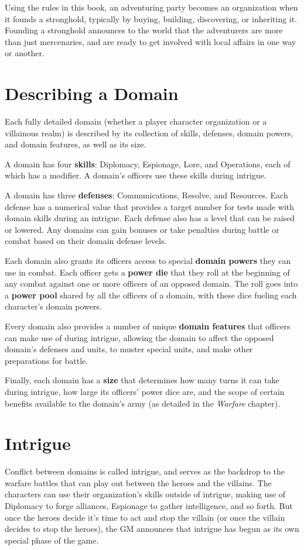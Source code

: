\documentclass[10pt,a4paper,twoside,bg=print,twocolumn,openany,nodeprecatedcode]{dndbook}
\begin{document}
Using the rules in this book, an adventuring party becomes an organization when it founds a stronghold, typically by buying, building, discovering, or inheriting it. Founding a stronghold announces to the world that the adventurers are more than just mercenaries, and are ready to get involved with local affairs in one way or another.

\section{Describing a Domain}
Each fully detailed domain (whether a player character organization or a villainous realm) is described by its collection of skills, defenses, domain powers, and domain features, as well as its size.

A domain has four \textbf{skills}: Diplomacy, Espionage, Lore, and Operations, each of which has a modifier. A domain's officers use these skills during intrigue.

A domain has three \textbf{defenses}: Communications, Resolve, and Resources. Each defense has a numerical value that provides a target number for tests made with domain skills during an intrigue. Each defense also has a level that can be raised or lowered. Any domains can gain bonuses or take penalties during battle or combat based on their domain defense levels.

Each domain also grants its officers access to special \textbf{domain powers} they can use in combat. Each officer gets a \textbf{power die} that they roll at the beginning of any combat against one or more officers of an opposed domain. The roll goes into a \textbf{power pool} shared by all the officers of a domain, with these dice fueling each character's domain powers.

Every domain also provides a number of unique \textbf{domain features} that officers can make use of during intrigue, allowing the domain to affect the opposed domain's defenses and units, to muster special units, and make other preparations for battle.

Finally, each domain has a \textbf{size} that determines how many turns it can take during intrigue, how large its officers' power dice are, and the scope of certain benefits available to the domain's army (as detailed in the \textit{Warfare} chapter).

\section{Intrigue}
Conflict between domains is called intrigue, and serves as the backdrop to the warfare battles that can play out between the heroes and the villains. The characters can use their organization's skills outside of intrigue, making use of Diplomacy to forge alliances, Espionage to gather intelligence, and so forth. But once the heroes decide it's time to act and stop the villain (or once the villain decides to stop the heroes), the GM announces that intrigue has begun as its own special phase of the game.
\end{document}
